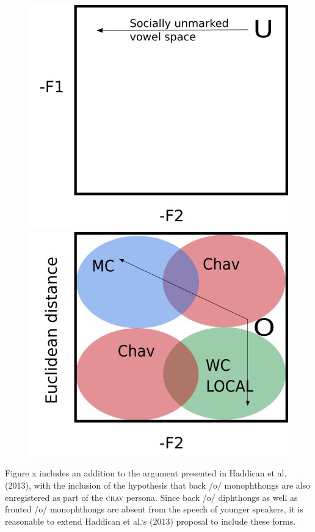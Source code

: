 \documentclass[PWPL]{article}
\begin{document}
\begin{figure}[H]
\centering

\includegraphics[scale=0.25]{u_hypothesis_space.png}
\includegraphics[scale=0.25]{o_hypothesis_space.png}
\end{figure}

Figure x includes an addition to the argument presented in Haddican et al. (2013), with the inclusion of the hypothesis that back /o/ monophthongs are also enregistered as part of the \textsc{chav} persona. Since back /o/ diphthongs as well as fronted /o/ monophthongs are absent from the speech of younger speakers, it is reasonable to extend Haddican et al.`s (2013) proposal to include these forms. 
\end{document}
